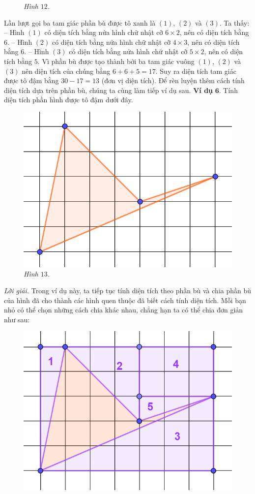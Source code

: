 \begin{multicols}{2}
\begin{figure}[H]
		\caption{\small\textit{\color{toancuabi}Hình $12$.}}
		\vspace*{-10pt}
	\end{figure}
	Lần lượt gọi ba tam giác phần bù được tô xanh là $(1)$, $(2)$ và $(3)$. Ta thấy:
	\vskip 0.1cm
	-- Hình $(1)$ có diện tích bằng nửa hình chữ nhật cỡ $6\times 2$, nên có diện tích bằng $6$.
	\vskip 0.1cm
	-- Hình $(2)$ có diện tích bằng nửa hình chữ nhật cỡ $4\times 3$, nên có diện tích bằng $6$.
	\vskip 0.1cm
	-- Hình $(3)$ có diện tích bằng nửa hình chữ nhật cỡ $5\times 2$, nên có diện tích bằng $5$.
	\vskip 0.1cm
	Vì phần bù được tạo thành bởi ba tam giác vuông $(1)$, $(2)$ và $(3)$ nên diện tích của chúng bằng $6+6+5=17$. Suy ra diện tích tam giác được tô đậm bằng $30-17=13$ (đơn vị diện tích).
	\vskip 0.1cm
	Để rèn luyện thêm cách tính diện tích dựa trên phần bù, chúng ta cùng làm tiếp ví dụ sau.  
	\vskip 0.1cm
	\textbf{\color{toancuabi}Ví dụ} $\pmb{6.}$ Tính diện tích phần hình được tô đậm dưới đây.
	\begin{figure}[H]
		\centering
		\vspace*{-5pt}
		\captionsetup{labelformat= empty, justification=centering}
		\includegraphics[width=0.5\linewidth]{13}
		\caption{\small\textit{\color{toancuabi}Hình $13$.}}
		\vspace*{-10pt}
	\end{figure}
	\textit{Lời giải.} Trong ví dụ này, ta tiếp tục tính diện tích theo phần bù và chia phần bù của hình đã cho thành các hình quen thuộc đã biết cách tính diện tích. Mỗi bạn nhỏ có thể chọn những cách chia khác nhau, chẳng hạn ta có thể chia đơn giản như sau: 
	\begin{figure}[H]
		\centering
		\vspace*{-5pt}
		\captionsetup{labelformat= empty, justification=centering}
		\includegraphics[width=0.5\linewidth]{14}

\end{figure}
\end{multicols}
